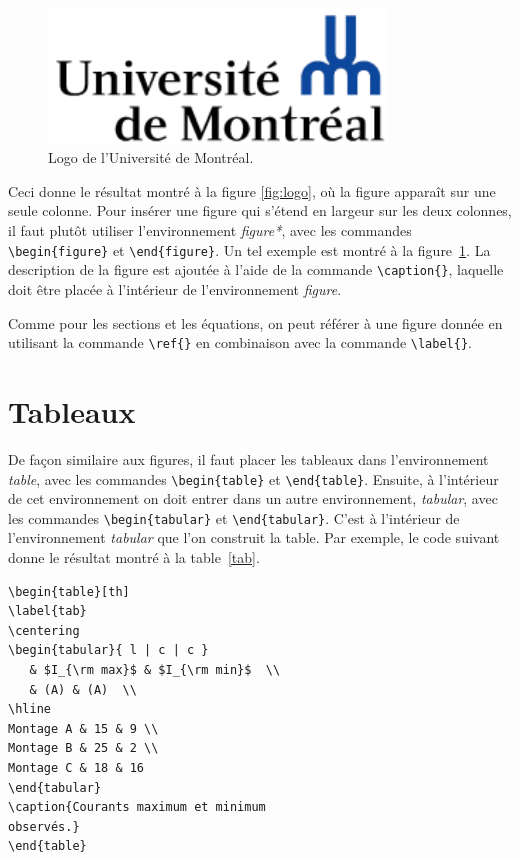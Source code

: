 \documentclass[10pt,letterpaper,twocolumn]{article}
\begin{document}
\begin{figure}[t]
\centering
\includegraphics[width=0.8\textwidth]{logo}
\caption{\label{fig:logo2} Logo de l'Université de Montréal.}
\end{figure}

Ceci donne le résultat montré à la figure \ref{fig:logo}, où la figure apparaît sur une seule colonne. Pour insérer une figure qui s'étend en largeur sur les deux colonnes, il faut plutôt utiliser l'environnement {\em figure*}, avec les commandes \verb+\begin{figure}+ et \verb+\end{figure}+. Un tel exemple est montré à la figure~\ref{fig:logo2}. La description de la figure est ajoutée à l'aide de la commande \verb+\caption{}+, laquelle doit être placée à l'intérieur de l'environnement {\em figure}.

Comme pour les sections et les équations, on peut référer à une figure donnée en utilisant la commande \verb|\ref{}| en combinaison avec la commande \verb|\label{}|.

\section{Tableaux}

De façon similaire aux figures, il faut placer les tableaux dans l'environnement {\em table}, avec les commandes \verb+\begin{table}+ et \verb+\end{table}+. Ensuite, à l'intérieur de cet environnement on doit entrer dans un autre environnement, {\em tabular}, avec les commandes \verb+\begin{tabular}+ et \verb+\end{tabular}+. C'est à l'intérieur de l'environnement {\em tabular} que l'on construit la table. Par exemple, le code suivant donne le résultat montré à la table~\ref{tab}.
\begin{verbatim}
\begin{table}[th]
\label{tab}
\centering
\begin{tabular}{ l | c | c }
   & $I_{\rm max}$ & $I_{\rm min}$  \\
   & (A) & (A)  \\
\hline
Montage A & 15 & 9 \\
Montage B & 25 & 2 \\
Montage C & 18 & 16
\end{tabular}
\caption{Courants maximum et minimum
observés.}
\end{table}
\end{verbatim}
\end{document}
